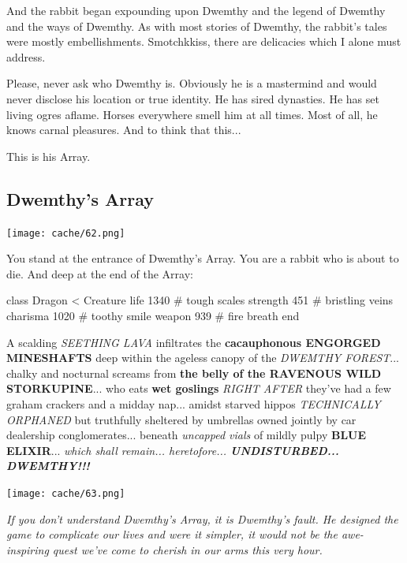 \documentclass[12pt,twoside]{report}
\begin{document}
And the rabbit began expounding upon Dwemthy and the legend of Dwemthy
and the ways of Dwemthy. As with most stories of Dwemthy, the rabbit's
tales were mostly embellishments. Smotchkkiss, there are delicacies
which I alone must address.

Please, never ask who Dwemthy is. Obviously he is a mastermind and
would never disclose his location or true identity. He has sired
dynasties. He has set living ogres aflame. Horses everywhere smell him
at all times. Most of all, he knows carnal pleasures. And to think
that this...

This is his Array.



\subsection{Dwemthy's Array}



	\texttt{[image: cache/62.png]}

You stand at the entrance of Dwemthy's Array.  You are a rabbit who is
about to die. And deep at the end of the Array:


\begin{rubycode}

 class Dragon < Creature
   life 1340     # tough scales
   strength 451  # bristling veins
   charisma 1020 # toothy smile
   weapon 939    # fire breath
 end

\end{rubycode}


A scalding {\em SEETHING LAVA} infiltrates the {\bf cacauphonous
  ENGORGED MINESHAFTS} deep within the ageless canopy of the {\em
  DWEMTHY FOREST}... chalky and nocturnal screams from {\bf the belly
  of the RAVENOUS WILD STORKUPINE}... who eats {\bf wet goslings} {\em
  RIGHT AFTER} they've had a few graham crackers and a midday
nap... amidst starved hippos {\em TECHNICALLY ORPHANED} but truthfully
sheltered by umbrellas owned jointly by car dealership
conglomerates... beneath {\em uncapped vials} of mildly pulpy {\bf
  BLUE ELIXIR}... {\em which shall remain... heretofore... {\bf
    UNDISTURBED... DWEMTHY!!!}}

	\texttt{[image: cache/63.png]}

{\em If you don't understand Dwemthy's Array, it is Dwemthy's
  fault. He designed the game to complicate our lives and were it
  simpler, it would not be the awe-inspiring quest we've come to
  cherish in our arms this very hour.}
\end{document}
